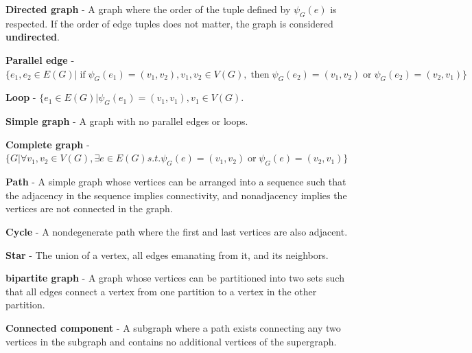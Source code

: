 \begin{defn}
  \textbf{Directed graph} - A graph where the order of the tuple defined by
  $\psi_G(e)$ is respected. If the order of edge tuples does not matter, the
  graph is considered \textbf{undirected}.
\end{defn}

\begin{defn}
  \textbf{Parallel edge} - $\{e_1,e_2 \in E(G) | \;\text{if}\; \psi_G(e_1) = (v_1,v_2),
  v_1,v_2 \in V(G), \;\text{then}\; \psi_G(e_2) = (v_1,v_2) \;\text{or}\; \psi_G(e_2) = (v_2,v_1) \}$
\end{defn}

\begin{defn}
  \textbf{Loop} - $\{e_1 \in E(G) | \psi_G(e_1) = (v_1,v_1), v_1 \in V(G)$.
\end{defn}

\begin{defn}
  \textbf{Simple graph} - A graph with no parallel edges or loops.
\end{defn}

\begin{defn}
  \textbf{Complete graph} - $\{G | \forall v_1,v_2 \in V(G), \exists e\in E(G)
  s.t. \psi_G(e) = (v_1,v_2) \;\text{or}\; \psi_G(e) = (v_2,v_1)\}$
\end{defn}

\begin{defn}
  \textbf{Path} - A simple graph whose vertices can be arranged into a sequence
  such that the adjacency in the sequence implies connectivity, and
  nonadjacency implies the vertices are not connected in the graph.
\end{defn}

\begin{defn}
  \textbf{Cycle} - A nondegenerate path where the first and last vertices are also adjacent.
\end{defn}

\begin{defn}
  \textbf{Star} - The union of a vertex, all edges emanating from it, and its
  neighbors.
\end{defn}

\begin{defn}
\textbf{bipartite graph} - A graph whose vertices can be partitioned into two sets such that all edges connect a vertex from one partition to a vertex in the other partition.
\end{defn}

\begin{defn}
  \textbf{Connected component} - A subgraph where a path exists connecting
  any two vertices in the subgraph and contains no additional vertices of the
  supergraph.
\end{defn}

